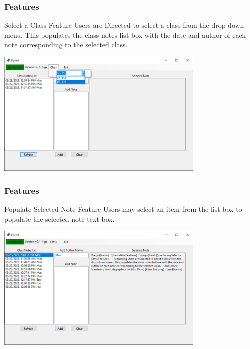 \documentclass[aspectratio=169]{beamer}
\begin{document}
\begin{frame}
    \frametitle{Features}

    \begin{block}{\centering Select a Class Feature}
        \centering Users are Directed to select a class from the drop-down menu. This populates the class notes list box with the date and author of each note corresponding to the selected class.
    \end{block}

    \centering \includegraphics [width=10cm] {Class List.png}
    
\end{frame}

\begin{frame}
    \frametitle{Features}

    \begin{block}{\centering Populate Selected Note Feature}
        \centering Users may select an item from the list box to populate the selected note text box.
    \end{block}

    \centering \includegraphics [width=10cm] {Select Class Note.png}
    
\end{frame}
\end{document}
